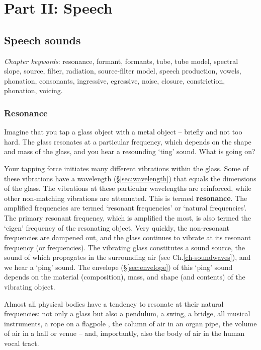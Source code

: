 \documentclass[
]{book}
\begin{document}
\part*{Part II: Speech}\label{part-part-ii-speech}

\chapter{Speech sounds}\label{ch-speechsounds}

\emph{Chapter keywords}: resonance, formant, formants, tube, tube model, spectral slope, source, filter, radiation, source-filter model, speech production, vowels, phonation, consonants, ingressive, egressive, noise, closure, constriction, phonation, voicing.

\section{Resonance}\label{sec:resonance}

Imagine that you tap a glass object with a metal object -- briefly and not too hard. The glass resonates at a particular frequency, which depends on the shape and mass of the glass, and you hear a resounding `ting' sound. What is going on?

Your tapping force initiates many different vibrations within the glass. Some of these vibrations have a wavelength (§\ref{sec:wavelength}) that equals the dimensions of the glass. The vibrations at these particular wavelengths are reinforced, while other non-matching vibrations are attenuated. This is termed \textbf{resonance}. The amplified frequencies are termed `resonant frequencies' or `natural frequencies'. The primary resonant frequency, which is amplified the most, is also termed the `eigen' frequency of the resonating object. Very quickly, the non-resonant frequencies are dampened out, and the glass continues to vibrate at its resonant frequency (or frequencies). The vibrating glass constitutes a sound source, the sound of which propagates in the surrounding air (see Ch.\ref{ch-soundwaves}), and we hear a `ping' sound. The envelope (§\ref{sec:envelope}) of this `ping' sound depends on the material (composition), mass, and shape (and contents) of the vibrating object.

Almost all physical bodies have a tendency to resonate at their natural frequencies: not only a glass but also a pendulum, a swing, a bridge, all musical instruments, a rope on a flagpole \citep[§61]{Minnaert_1970v2}, the column of air in an organ pipe, the volume of air in a hall or venue -- and, importantly, also the body of air in the human vocal tract.
\end{document}

